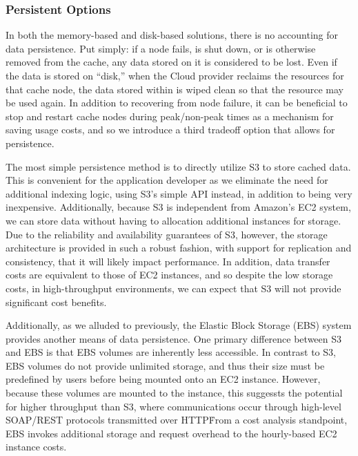 \subsubsection{Persistent Options} %
\label{subsub:persistent_options}
In both the memory-based and disk-based solutions, there is no accounting for
data persistence. Put simply: if a node fails, is shut down, or is otherwise
removed from the cache, any data stored on it is considered to be lost. Even if
the data is stored on ``disk,'' when the Cloud provider reclaims the resources
for that cache node, the data stored within is wiped clean so that the resource
may be used again. In addition to recovering from node failure, it can be
beneficial to stop and restart cache nodes during peak/non-peak times as a
mechanism for saving usage costs, and so we introduce a third tradeoff option
that allows for persistence.

The most simple persistence method is to directly utilize S3 to store cached
data. This is convenient for the application developer as we eliminate the
need for additional indexing logic, using S3's simple API instead, in addition
to being very inexpensive. Additionally, because S3 is independent from
Amazon's EC2 system, we can store data without having to allocation additional
instances for storage. Due to the reliability and availability guarantees of
S3, however, the storage architecture is provided in such a robust fashion,
with support for replication and consistency, that it will likely impact
performance. In addition, data transfer costs are equivalent to those of EC2
instances, and so despite the low storage costs, in high-throughput
environments, we can expect that S3 will not provide significant cost benefits.

Additionally, as we alluded to previously, the Elastic Block Storage (EBS)
system provides another means of data persistence. One primary difference
between S3 and EBS is that EBS volumes are inherently less accessible. In
contrast to S3, EBS volumes do not provide unlimited storage, and thus their
size must be predefined by users before being mounted onto an EC2 instance.
However, because these volumes are mounted to the instance, this suggessts the
potential for higher throughput than S3, where communications occur through
high-level SOAP/REST protocols transmitted over HTTP\. From a cost analysis
standpoint, EBS invokes additional storage and request overhead to the
hourly-based EC2 instance costs.


